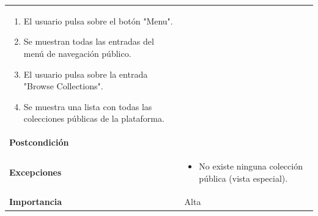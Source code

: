 \documentclass[
]{article}
\providecommand{\tightlist}{%
  \setlength{\itemsep}{0pt}\setlength{\parskip}{0pt}}
\begin{document}
\begin{longtable}[]{@{}ll@{}}
\begin{minipage}[t]{0.72\columnwidth}
\begin{enumerate}
\def\labelenumi{\arabic{enumi}.}
\tightlist
\item
  El usuario pulsa sobre el botón "Menu".
\item
  Se muestran todas las entradas del menú de navegación público.
\item
  El usuario pulsa sobre la entrada "Browse Collections".
\item
  Se muestra una lista con todas las colecciones públicas de la
  plataforma.
\end{enumerate}\strut
\end{minipage}\tabularnewline
\begin{minipage}[t]{0.22\columnwidth}\raggedright
\textbf{Postcondición}\strut
\end{minipage} & \begin{minipage}[t]{0.72\columnwidth}\raggedright
\strut
\end{minipage}\tabularnewline
\begin{minipage}[t]{0.22\columnwidth}\raggedright
\textbf{Excepciones}\strut
\end{minipage} & \begin{minipage}[t]{0.72\columnwidth}\raggedright
\begin{itemize}
\tightlist
\item
  No existe ninguna colección pública (vista especial).
\end{itemize}\strut
\end{minipage}\tabularnewline
\begin{minipage}[t]{0.22\columnwidth}\raggedright
\textbf{Importancia}\strut
\end{minipage} & \begin{minipage}[t]{0.72\columnwidth}\raggedright
Alta\strut
\end{minipage}\tabularnewline
\bottomrule
\end{longtable}
\end{document}
